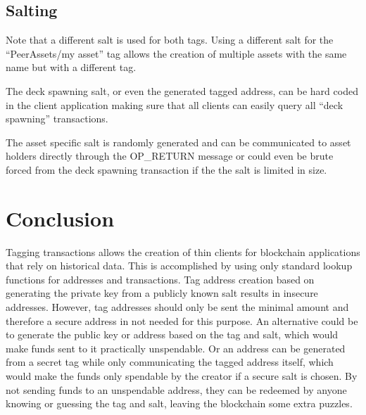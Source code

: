 \documentclass[a4paper,10pt]{article}
\begin{document}
\subsection{Salting}
Note that a different salt is used for both tags.
Using a different salt for the ``PeerAssets/my asset'' tag allows the creation of multiple assets with the same name but with a different tag.

The deck spawning salt, or even the generated tagged address, can be hard coded in the client application making sure that all clients can easily query all ``deck spawning'' transactions.

The asset specific salt is randomly generated and can be communicated to asset holders directly through the OP\_RETURN message or could even be brute forced from the deck spawning transaction if the the salt is limited in size.


\section{Conclusion}
Tagging transactions allows the creation of thin clients for blockchain applications that rely on historical data.
This is accomplished by using only standard lookup functions for addresses and transactions.
Tag address creation based on generating the private key from a publicly known salt results in insecure addresses.
However, tag addresses should only be sent the minimal amount and therefore a secure address in not needed for this purpose.
An alternative could be to generate the public key or address based on the tag and salt, which would make funds sent to it practically unspendable.
Or an address can be generated from a secret tag while only communicating the tagged address itself, which would make the funds only spendable by the creator if a secure salt is chosen.
By not sending funds to an unspendable address, they can be redeemed by anyone knowing or guessing the tag and salt, leaving the blockchain some extra puzzles.
\end{document}
